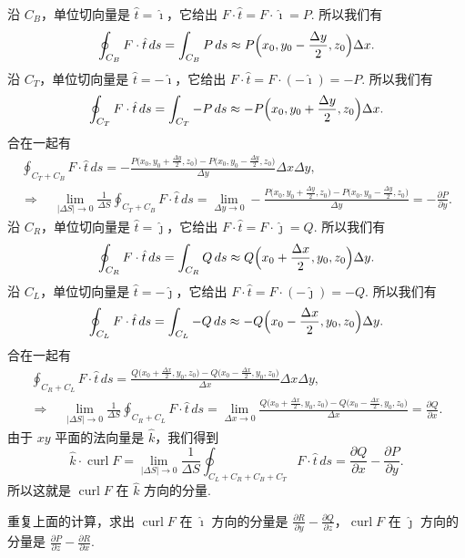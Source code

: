 沿 $C_B$，单位切向量是 $\hat{t}=\hat{\imath}$，它给出 $F\cdot\hat{t}=F\cdot\hat{\imath}=P$. 所以我们有
\[
\oint_{C_B}F\cdot\hat{t}\,ds=\int_{C_B}P\,ds\approx P\Bigl(x_0,y_0-\frac{\Delta y}{2},z_0\Bigr)\Delta x.
\]
沿 $C_T$，单位切向量是 $\hat{t}=-\hat{\imath}$，它给出 $F\cdot\hat{t}=F\cdot(-\hat{\imath})=-P$. 所以我们有
\[
\oint_{C_T}F\cdot\hat{t}\,ds=\int_{C_T}-P\,ds\approx -P\Bigl(x_0,y_0+\frac{\Delta y}{2},z_0\Bigr)\Delta x.
\]
合在一起有
\begin{align*}
\oint_{C_T+C_B}F\cdot\hat{t}\,ds=-\frac{P\bigl(x_0,y_0+\frac{\Delta y}{2},z_0\bigr)-P\bigl(x_0,y_0-\frac{\Delta y}{2},z_0\bigr)}{\Delta y}\Delta x\Delta y, \\
\Rightarrow\quad\lim_{|\Delta S|\to0}\frac{1}{\Delta S}\oint_{C_T+C_B}F\cdot\hat{t}\,ds
=\lim_{\Delta y\to0}-\frac{P\bigl(x_0,y_0+\frac{\Delta y}{2},z_0\bigr)-P\bigl(x_0,y_0-\frac{\Delta y}{2},z_0\bigr)}{\Delta y}
=-\frac{\partial P}{\partial y}.
\end{align*}
沿 $C_R$，单位切向量是 $\hat{t}=\hat{\jmath}$，它给出 $F\cdot\hat{t}=F\cdot\hat{\jmath}=Q$. 所以我们有
\[
\oint_{C_R}F\cdot\hat{t}\,ds=\int_{C_R}Q\,ds\approx Q\Bigl(x_0+\frac{\Delta x}{2},y_0,z_0\Bigr)\Delta y.
\]
沿 $C_L$，单位切向量是 $\hat{t}=-\hat{\jmath}$，它给出 $F\cdot\hat{t}=F\cdot(-\hat{\jmath})=-Q$. 所以我们有
\[
\oint_{C_L}F\cdot\hat{t}\,ds=\int_{C_L}-Q\,ds\approx -Q\Bigl(x_0-\frac{\Delta x}{2},y_0,z_0\Bigr)\Delta y.
\]
合在一起有
\begin{align*}
\oint_{C_R+C_L}F\cdot\hat{t}\,ds=\frac{Q\bigl(x_0+\frac{\Delta x}{2},y_0,z_0\bigr)-Q\bigl(x_0-\frac{\Delta x}{2},y_0,z_0\bigr)}{\Delta x}\Delta x\Delta y, \\
\Rightarrow\quad\lim_{|\Delta S|\to0}\frac{1}{\Delta S}\oint_{C_R+C_L}F\cdot\hat{t}\,ds
=\lim_{\Delta x\to0}\frac{Q\bigl(x_0+\frac{\Delta x}{2},y_0,z_0\bigr)-Q\bigl(x_0-\frac{\Delta x}{2},y_0,z_0\bigr)}{\Delta x}
=\frac{\partial Q}{\partial x}.
\end{align*}
由于 $xy$ 平面的法向量是 $\hat{k}$，我们得到
\[
\hat{k}\cdot\operatorname{curl}F=\lim_{|\Delta S|\to0}\frac{1}{\Delta S}\oint_{C_L+C_R+C_B+C_T}F\cdot\hat{t}\,ds=\frac{\partial Q}{\partial x}-\frac{\partial P}{\partial y}.
\]
所以这就是 $\operatorname{curl}F$ 在 $\hat{k}$ 方向的分量.

\begin{question}\label{q:9-6}
重复上面的计算，求出 $\operatorname{curl}F$ 在 $\hat{\imath}$ 方向的分量是 $\frac{\partial R}{\partial y}-\frac{\partial Q}{\partial z}$，$\operatorname{curl}F$ 在 $\hat{\jmath}$ 方向的分量是 $\frac{\partial P}{\partial z}-\frac{\partial R}{\partial x}$.
\end{question}

